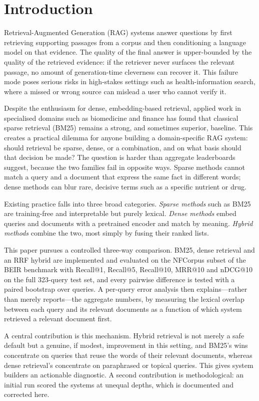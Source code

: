 \documentclass[10pt,letterpaper,twocolumn]{article}
\begin{document}
\section{Introduction}
Retrieval-Augmented Generation (RAG) systems answer questions by first retrieving supporting passages from a corpus and then conditioning a language model on that evidence. The quality of the final answer is upper-bounded by the quality of the retrieved evidence: if the retriever never surfaces the relevant passage, no amount of generation-time cleverness can recover it. This failure mode poses serious risks in high-stakes settings such as health-information search, where a missed or wrong source can mislead a user who cannot verify it.

Despite the enthusiasm for dense, embedding-based retrieval, applied work in specialised domains such as biomedicine and finance has found that classical sparse retrieval (BM25) remains a strong, and sometimes superior, baseline. This creates a practical dilemma for anyone building a domain-specific RAG system: should retrieval be sparse, dense, or a combination, and on what basis should that decision be made? The question is harder than aggregate leaderboards suggest, because the two families fail in opposite ways. Sparse methods cannot match a query and a document that express the same fact in different words; dense methods can blur rare, decisive terms such as a specific nutrient or drug.

Existing practice falls into three broad categories. \emph{Sparse methods} such as BM25 are training-free and interpretable but purely lexical. \emph{Dense methods} embed queries and documents with a pretrained encoder and match by meaning. \emph{Hybrid methods} combine the two, most simply by fusing their ranked lists.

This paper pursues a controlled three-way comparison. BM25, dense retrieval and an RRF hybrid are implemented and evaluated on the NFCorpus subset of the BEIR benchmark with Recall@1, Recall@5, Recall@10, MRR@10 and nDCG@10 on the full 323-query test set, and every pairwise difference is tested with a paired bootstrap over queries. A per-query error analysis then explains---rather than merely reports---the aggregate numbers, by measuring the lexical overlap between each query and its relevant documents as a function of which system retrieved a relevant document first.

A central contribution is this mechanism. Hybrid retrieval is not merely a safe default but a genuine, if modest, improvement in this setting, and BM25's wins concentrate on queries that reuse the words of their relevant documents, whereas dense retrieval's concentrate on paraphrased or topical queries. This gives system builders an actionable diagnostic. A second contribution is methodological: an initial run scored the systems at unequal depths, which is documented and corrected here.
\end{document}
